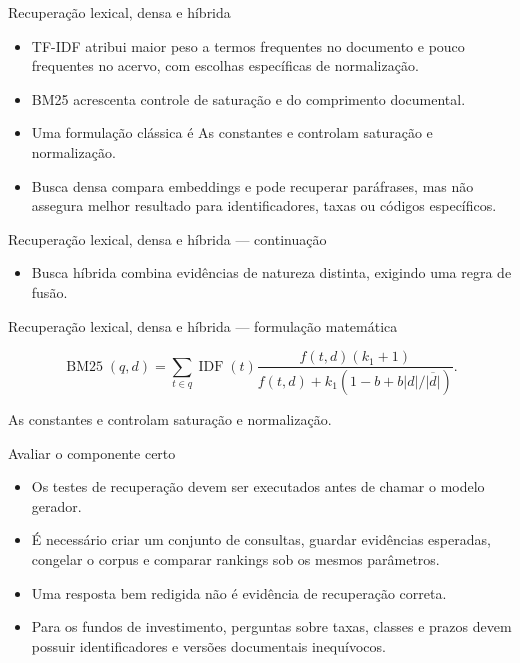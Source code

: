 \documentclass[10pt,aspectratio=169]{beamer}
\begin{document}
\begin{frame}[t]{Recuperação lexical, densa e híbrida}
\small
\begin{itemize}
\item TF-IDF atribui maior peso a termos frequentes no documento e pouco frequentes no acervo, com escolhas específicas de normalização.
\item BM25 acrescenta controle de saturação e do comprimento documental.
\item Uma formulação clássica é As constantes e controlam saturação e normalização.
\item Busca densa compara embeddings e pode recuperar paráfrases, mas não assegura melhor resultado para identificadores, taxas ou códigos específicos.
\end{itemize}
\end{frame}

\begin{frame}[t]{Recuperação lexical, densa e híbrida — continuação}
\small
\begin{itemize}
\item Busca híbrida combina evidências de natureza distinta, exigindo uma regra de fusão.
\end{itemize}
\end{frame}

\begin{frame}[t]{Recuperação lexical, densa e híbrida — formulação matemática}
\small
\vspace{3mm}\begin{center}\small\[\operatorname{BM25}(q,d)=\sum_{t\in q}\operatorname{IDF}(t)
\frac{f(t,d)(k_1+1)}{f(t,d)+k_1(1-b+b|d|/\overline{|d|})}.\]\end{center}
\vspace{3mm}\small As constantes e controlam saturação e normalização.
\end{frame}

\begin{frame}[t]{Avaliar o componente certo}
\small
\begin{itemize}
\item Os testes de recuperação devem ser executados antes de chamar o modelo gerador.
\item É necessário criar um conjunto de consultas, guardar evidências esperadas, congelar o corpus e comparar rankings sob os mesmos parâmetros.
\item Uma resposta bem redigida não é evidência de recuperação correta.
\item Para os fundos de investimento, perguntas sobre taxas, classes e prazos devem possuir identificadores e versões documentais inequívocos.
\end{itemize}
\end{frame}
\end{document}
